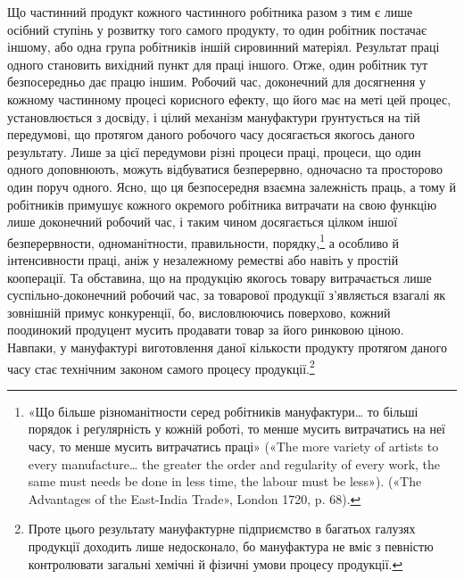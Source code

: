 Що частинний продукт кожного частинного робітника разом
з тим є лише осібний ступінь у розвитку того самого продукту,
то один робітник постачає іншому, або одна група робітників
іншій сировинний матеріял. Результат праці одного становить
вихідний пункт для праці іншого. Отже, один робітник тут безпосередньо
дає працю іншим. Робочий час, доконечний для
досягнення у кожному частинному процесі корисного ефекту,
що його має на меті цей процес, установлюється з досвіду, і цілий
механізм мануфактури ґрунтується на тій передумові, що протягом
даного робочого часу досягається якогось даного результату.
Лише за цієї передумови різні процеси праці, процеси, що
один одного доповнюють, можуть відбуватися безперервно,
одночасно та просторово один поруч одного. Ясно, що ця безпосередня
взаємна залежність праць, а тому й робітників примушує
кожного окремого робітника витрачати на свою функцію лише
доконечний робочий час, і таким чином досягається цілком іншої
безперервности, одноманітности, правильности, порядку,\footnote{
«Що більше різноманітности серед робітників мануфактури\dots{} то
більші порядок і реґулярність у кожній роботі, то менше мусить витрачатись
на неї часу, то менше мусить витрачатись праці» («The more variety
of artists to every manufacture\dots{} the greater the order and regularity of
every work, the same must needs be done in less time, the labour must
be less»). («The Advantages of the East-India Trade», London 1720, p. 68).
} а особливо
й інтенсивности праці, аніж у незалежному реместві або
навіть у простій кооперації. Та обставина, що на продукцію
якогось товару витрачається лише суспільно-доконечний робочий
час, за товарової продукції з’являється взагалі як зовнішній
примус конкуренції, бо, висловлюючись поверхово, кожний
поодинокий продуцент мусить продавати товар за його ринковою
ціною. Навпаки, у мануфактурі виготовлення даної кількости
продукту протягом даного часу стає технічним законом самого
процесу продукції.\footnote{
Проте цього результату мануфактурне підприємство в багатьох
галузях продукції доходить лише недосконало, бо мануфактура не вміє
з певністю контролювати загальні хемічні й фізичні умови процесу продукції.
}

